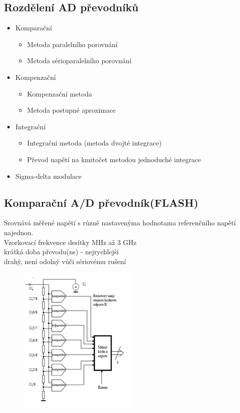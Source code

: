 \subsection*{Rozdělení AD převodníků}
\begin{itemize}
    \item Komparační
    \begin{itemize}
        \item Metoda paralelního porovnání
        \item Metoda sérioparalelního porovnání
    \end{itemize}
    \item Kompenzační
    \begin{itemize}
        \item Kompenzační metoda
        \item Metoda postupné aproximace
    \end{itemize}
    \item Integrační
    \begin{itemize}
        \item Integrační metoda (metoda dvojté integrace)
        \item Převod napětí na kmitočet metodou jednoduché integrace 
    \end{itemize}
    \item Sigma-delta modulace
\end{itemize}

\subsection*{Komparační A/D převodník(FLASH)}
Srovnává měřené napětí s různě nastavenýma hodnotama referenčního napětí najednou.\\
Vzorkovací frekvence desítky MHz až 3 GHz\\
krátká doba převodu(ns) - nejrychlejší\\
drahý, není odolný vůči sériovému rušení
\begin{figure}[H]
    \includegraphics*[scale = 1.3]{images/adc_komparacni.png}
\end{figure} 
\newpage
